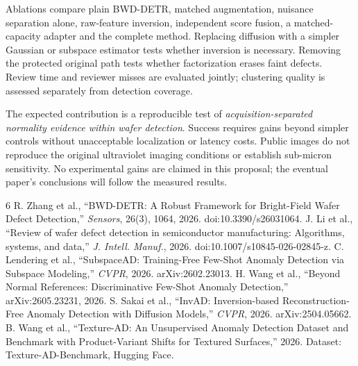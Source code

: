 \documentclass[10pt,a4paper,twocolumn]{article}
\begin{document}
Ablations compare plain BWD-DETR, matched augmentation, nuisance separation alone, raw-feature inversion, independent score fusion, a matched-capacity adapter and the complete method. Replacing diffusion with a simpler Gaussian or subspace estimator tests whether inversion is necessary. Removing the protected original path tests whether factorization erases faint defects. Review time and reviewer misses are evaluated jointly; clustering quality is assessed separately from detection coverage.

The expected contribution is a reproducible test of \emph{acquisition-separated normality evidence within wafer detection}. Success requires gains beyond simpler controls without unacceptable localization or latency costs. Public images do not reproduce the original ultraviolet imaging conditions or establish sub-micron sensitivity. No experimental gains are claimed in this proposal; the eventual paper's conclusions will follow the measured results.

\begin{thebibliography}{6}
\setlength{\itemsep}{0pt}
\footnotesize
{} R. Zhang et al., ``BWD-DETR: A Robust Framework for Bright-Field Wafer Defect Detection,'' \emph{Sensors}, 26(3), 1064, 2026. doi:10.3390/s26031064.
 J. Li et al., ``Review of wafer defect detection in semiconductor manufacturing: Algorithms, systems, and data,'' \emph{J. Intell. Manuf.}, 2026. doi:10.1007/s10845-026-02845-z.
 C. Lendering et al., ``SubspaceAD: Training-Free Few-Shot Anomaly Detection via Subspace Modeling,'' \emph{CVPR}, 2026. arXiv:2602.23013.
 H. Wang et al., ``Beyond Normal References: Discriminative Few-Shot Anomaly Detection,'' arXiv:2605.23231, 2026.
 S. Sakai et al., ``InvAD: Inversion-based Reconstruction-Free Anomaly Detection with Diffusion Models,'' \emph{CVPR}, 2026. arXiv:2504.05662.
 B. Wang et al., ``Texture-AD: An Unsupervised Anomaly Detection Dataset and Benchmark with Product-Variant Shifts for Textured Surfaces,'' 2026. Dataset: Texture-AD-Benchmark, Hugging Face.
\end{thebibliography}
\end{document}
